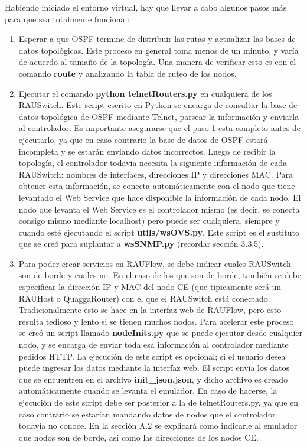 Habiendo iniciado el entorno virtual, hay que llevar a cabo algunos pasos más para que sea totalmente funcional:
\begin{enumerate}
	\item Esperar a que OSPF termine de distribuir las rutas y actualizar las bases de datos topológicas. Este proceso en general toma menos de un minuto, y varía de acuerdo al tamaño de la topología. Una manera de verificar esto es con el comando \textbf{route} y analizando la tabla de ruteo de los nodos.
	\item Ejecutar el comando \textbf{python telnetRouters.py} en cualquiera de los RAUSwitch. Este script escrito en Python se encarga de consultar la base de datos topológica de OSPF mediante Telnet, parsear la información y enviarla al controlador. Es importante asegurarse que el paso 1 esta completo antes de ejecutarlo, ya que en caso contrario la base de datos de OSPF estará incompleta y se estarán enviando datos incorrectos. Luego de recibir la topología, el controlador todavía necesita la siguiente información de cada RAUSwitch: nombres de interfaces, direcciones IP y direcciones MAC. Para obtener esta información, se conecta automáticamente con el nodo que tiene levantado el Web Service que hace disponible la información de cada nodo. El nodo que levanta el Web Service es el controlador mismo (es decir, se conecta consigo mismo mediante localhost) pero puede ser cualquiera, siempre y cuando esté ejecutando el script \textbf{utils/wsOVS.py}. Este script es el sustituto que se creó para suplantar a \textbf{wsSNMP.py} (recordar sección 3.3.5).
	\item Para poder crear servicios en RAUFlow, se debe indicar cuales RAUSwitch son de borde y cuales no. En el caso de los que son de borde, también se debe especificar la dirección IP y MAC del nodo CE (que típicamente será un RAUHost o QuaggaRouter) con el que el RAUSwitch está conectado. Tradicionalmente esto se hace en la interfaz web de RAUFlow, pero esto resulta tedioso y lento si se tienen muchos nodos. Para acelerar este proceso se creó un script llamado \textbf{nodeInits.py} que se puede ejecutar desde cualquier nodo, y se encarga de enviar toda esa información al controlador mediante pedidos HTTP. La ejecución de este script es opcional; si el usuario desea puede ingresar los datos mediante la interfaz web. El script envía los datos que se encuentren en el archivo \textbf{init\_json.json}, y dicho archivo es creado automáticamente cuando se levanta el emulador. En caso de hacerse, la ejecución de este script debe ser posterior a la de telnetRouters.py, ya que en caso contrario se estarían mandando datos de nodos que el controlador todavía no conoce. En la sección A.2 se explicará como indicarle al emulador que nodos son de borde, así como las direcciones de los nodos CE.
\end{enumerate}

